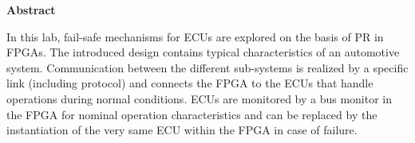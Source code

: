 \null\vfill


\begin{center}
\textbf{Abstract}
\vspace*{5mm}
\end{center}
In this lab, fail-safe mechanisms for \glspl{ECU} are explored on the basis of \gls{PR} in \glspl{FPGA}.
The introduced design contains typical characteristics of an automotive system.
Communication between the different sub-systems is realized by a specific link (including protocol) and connects the \gls{FPGA} to the \glspl{ECU} that handle operations during normal conditions. 
\glspl{ECU} are monitored by a bus monitor in the \gls{FPGA} for nominal operation characteristics and can be replaced by the instantiation of the very same \gls{ECU} within the \gls{FPGA} in case of failure.

\par\vfill\vfill
\newpage
